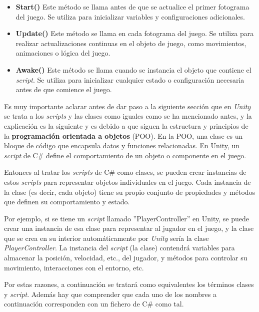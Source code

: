 \begin{itemize}    
    \item \textbf{Start()} Este método se llama antes de que se actualice el primer fotograma del juego. Se utiliza para inicializar variables y configuraciones adicionales.
   
    \item \textbf{Update()} Este método se llama en cada fotograma del juego. Se utiliza para realizar actualizaciones continuas en el objeto de juego, como movimientos, animaciones o lógica del juego.

    \item \textbf{Awake()}  Este método se llama cuando se instancia el objeto que contiene el \textit{script}. Se utiliza para inicializar cualquier estado o configuración necesaria antes de que comience el juego.
\end{itemize}

Es muy importante aclarar antes de dar paso a la siguiente sección que en \textit{Unity} se trata a los \textit{scripts} y las clases como iguales como se ha mencionado antes, y la explicación es la siguiente y es debido a que siguen la estructura y principios de la \textbf{programación orientada a objetos} (POO). En la POO, una clase es un bloque de código que encapsula datos y funciones relacionadas. En Unity, un \textit{script} de C\# define el comportamiento de un objeto o componente en el juego.

Entonces al tratar los \textit{scripts} de C\# como clases, se pueden crear instancias de estos \textit{scripts} para representar objetos individuales en el juego. Cada instancia de la clase (es decir, cada objeto) tiene su propio conjunto de propiedades y métodos que definen su comportamiento y estado.

Por ejemplo, si se tiene un \textit{script} llamado ''PlayerController'' en Unity, se puede crear una instancia de esa clase para representar al jugador en el juego, y la clase que se crea en su interior automáticamente por \textit{Unity} sería la clase \textit{PlayerController}. La instancia del \textit{script} (la clase) contendrá variables para almacenar la posición, velocidad, etc., del jugador, y métodos para controlar su movimiento, interacciones con el entorno, etc.

Por estas razones, a continuación se tratará  como equivalentes los términos clases y \textit{script}. Además hay que comprender que cada uno de los nombres a continuación corresponden con un fichero de C\# como tal.

